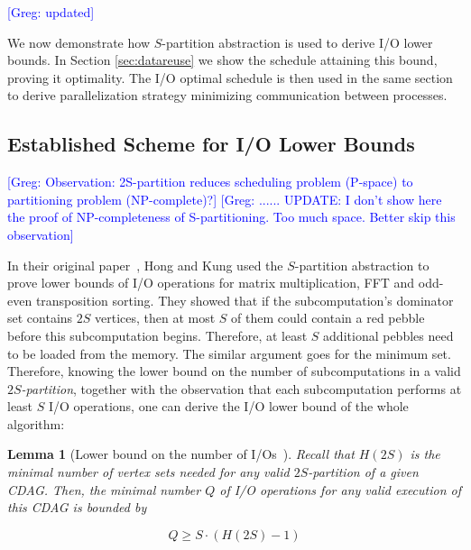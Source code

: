 \documentclass[sigplan,review,anonymous]{acmart}\settopmatter{printfolios=true,printccs=false,printacmref=false}
\newcommand\greg[1]{\textcolor{blue}{[Greg: #1]}}
\newcommand\mac[1]{\textcolor{red}{[Mac: #1]}}
\newtheorem{lma}{Lemma}
\begin{document}
\greg{updated}

We now demonstrate how $S$-partition abstraction is used to derive I/O lower 
bounds. In Section \ref{sec:datareuse} we show the schedule attaining this 
bound, proving it optimality. The I/O optimal schedule is then used in the same 
section to derive parallelization strategy minimizing communication between 
processes. 

\subsection{Established Scheme for I/O Lower Bounds}
\greg{Observation: 2S-partition reduces scheduling problem (P-space) to 
partitioning problem (NP-complete)?}
\greg{...... UPDATE: I don't show here the proof of NP-completeness of 
S-partitioning. Too much space. Better skip this observation}

In their original paper~\cite{redblue}, Hong and Kung used the $S$-partition 
abstraction to prove lower bounds of I/O operations for matrix multiplication, 
FFT and odd-even transposition sorting. They showed that if the 
subcomputation's dominator set contains $2S$ vertices, then at most $S$ of them 
could contain a red pebble before this subcomputation begins. Therefore, at 
least $S$ additional pebbles need to be loaded from the memory. The similar 
argument goes for the minimum set. Therefore, knowing the lower bound on the 
number of subcomputations in a valid \emph{$2S$-partition}, together with the 
observation that each subcomputation performs at least $S$ I/O operations, one 
can derive the I/O lower bound of the whole algorithm:
%
%

\begin{lma}[Lower bound on the number of I/Os~\cite{redblue}]
%
Recall that $H(2S)$ is the minimal number of vertex sets needed for any
valid $2S$-partition of a given CDAG. Then, the minimal number $Q$ of I/O 
operations
for any valid execution of this CDAG is bounded by

\begin{equation}
\label{eq:redbluebound}
Q \ge S \cdot (H(2S) - 1)
\end{equation}
%
\end{lma}
\end{document}
